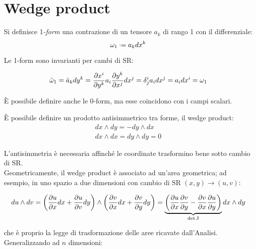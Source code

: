 
\section{Wedge product}

\begin{definition}
	Si definisce 1\textit{-form} una contrazione di un tensore $ a_k $ di rango 1 con il differenziale:
	\begin{equation}
		\omega_1 \defeq a_k dx^k
		\label{eq:3.1}
	\end{equation}
\end{definition}

Le 1-form sono invarianti per cambi di SR:

\begin{equation}
	\tilde{\omega}_1 = \tilde{a}_k dy^k = \frac{\partial x^i}{\partial y^k} a_i \frac{\partial y^k}{\partial x^j} dx^j = \delta^i_j a_i dx^j = a_i dx^i = \omega_1
	\label{eq:3.2}
\end{equation}

È possibile definire anche le 0-form, ma esse coincidono con i campi scalari.

È possibile definire un prodotto antisimmetrico tra forme, il wedge product:
\begin{equation}
	\begin{split}
		dx \wedge dy = - dy \wedge dx \\
		dx \wedge dx = dy \wedge dy = 0
	\end{split}
	\label{eq:3.3}
\end{equation}

L'antisimmetria è necessaria affinché le coordinate trasformino bene sotto cambio di SR.\\
Geometricamente, il wedge product è associato ad un'area geometrica; ad esempio, in uno spazio a due dimensioni con cambio di SR $ (x,y) \rightarrow (u,v) $:

\begin{equation}
	du \wedge dv = \left( \frac{\partial u}{\partial x} dx + \frac{\partial u}{\partial v} dy \right) \wedge \left( \frac{\partial v}{\partial x} dx + \frac{\partial v}{\partial y} dy \right) = \underbrace{\left( \frac{\partial u}{\partial x} \frac{\partial v}{\partial y} - \frac{\partial v}{\partial x} \frac{\partial u}{\partial y} \right)}_{\det\mathbf{\text{J}}} dx \wedge dy
	\label{eq:3.4}
\end{equation}

che è proprio la legge di trasformazione delle aree ricavate dall'Analisi.\\
Generalizzando ad $ n $ dimensioni:

